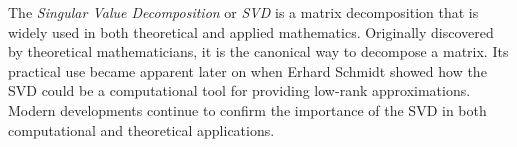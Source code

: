 
\label{lab:SVD}
%


The \emph{Singular Value Decomposition} or \emph{SVD} is a matrix decomposition that is widely used in both theoretical and applied mathematics. 
Originally discovered by theoretical mathematicians, it is the canonical way to decompose a matrix.
Its practical use became apparent later on when Erhard Schmidt showed how the SVD could be a computational tool for providing low-rank approximations.
Modern developments continue to confirm the importance of the SVD in both computational and theoretical applications.

